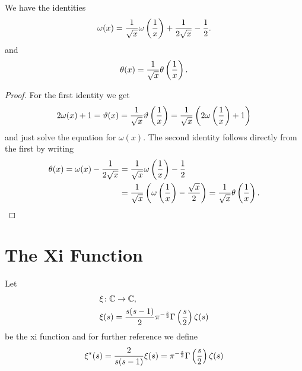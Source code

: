 \begin{corollary}\label{cor:ThetaIdentity}
	We have the identities
\begin{equation*}
	\omega(x) = \frac{1}{\sqrt{x}} \omega\left(\frac{1}{x}\right) + \frac{1}{2\sqrt{x}} - \frac{1}{2}.
\end{equation*}
	and
\begin{equation*}
	\theta(x) = \frac{1}{\sqrt{x}} \theta\left(\frac{1}{x}\right).
\end{equation*}
\end{corollary}
\begin{proof}
	For the first identity we get
\begin{equation*}
	2 \omega(x) + 1 = \vartheta(x) = \frac{1}{\sqrt{x}} \vartheta\left(\frac{1}{x}\right) = \frac{1}{\sqrt{x}} \left(2 \omega\left(\frac{1}{x}\right) + 1\right)
\end{equation*}
	and just solve the equation for $\omega(x)$. The second identity follows directly from the first by writing
\begin{equation*}
\begin{aligned}	
	\theta(x) = \omega(x) - \frac{1}{2 \sqrt{x}} 
	&= \frac{1}{\sqrt{x}} \omega\left(\frac{1}{x}\right) - \frac{1}{2} \\ 
	&= \frac{1}{\sqrt{x}} \left(\omega\left(\frac{1}{x}\right) - \frac{\sqrt{x}}{2}\right) = \frac{1}{\sqrt{x}} \theta\left(\frac{1}{x}\right).
\end{aligned}
\end{equation*}
\end{proof}


\section{The Xi Function}


\begin{definition}\label{def:XiDefinition}
	Let
\begin{equation*}
\begin{aligned}
	&\xi \colon \mathbb{C} \to \mathbb{C}, \\
	&\xi(s) = \frac{s(s - 1)}{2} \pi ^{-\frac{s}{2}} \Gamma\left(\frac{s}{2}\right) \zeta(s)
\end{aligned}
\end{equation*}
	be the xi function and for further reference we define
\begin{equation*}
	\xi^*(s) = \frac{2}{s(s - 1)} \xi(s) = \pi ^{-\frac{s}{2}} \Gamma\left(\frac{s}{2}\right) \zeta(s)
\end{equation*}
\end{definition}


